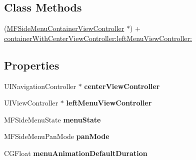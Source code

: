 \subsection*{Class Methods}
\begin{DoxyCompactItemize}
\item 
(\hyperlink{interface_m_f_side_menu_container_view_controller}{M\-F\-Side\-Menu\-Container\-View\-Controller} $\ast$) + \hyperlink{interface_m_f_side_menu_container_view_controller_a8dd4ba3c4452eb18fe9bfe73aebd978a}{container\-With\-Center\-View\-Controller\-:left\-Menu\-View\-Controller\-:}
\end{DoxyCompactItemize}
\subsection*{Properties}
\begin{DoxyCompactItemize}
\item 
\hypertarget{interface_m_f_side_menu_container_view_controller_a49e8e7e16a8d53b0e0c4378994c3abe5}{U\-I\-Navigation\-Controller $\ast$ {\bfseries center\-View\-Controller}}\label{interface_m_f_side_menu_container_view_controller_a49e8e7e16a8d53b0e0c4378994c3abe5}

\item 
\hypertarget{interface_m_f_side_menu_container_view_controller_a048098d93fef8397e4419e77d697b521}{U\-I\-View\-Controller $\ast$ {\bfseries left\-Menu\-View\-Controller}}\label{interface_m_f_side_menu_container_view_controller_a048098d93fef8397e4419e77d697b521}

\item 
\hypertarget{interface_m_f_side_menu_container_view_controller_a4ee6f366285ae4e3b63af91d8aeed278}{M\-F\-Side\-Menu\-State {\bfseries menu\-State}}\label{interface_m_f_side_menu_container_view_controller_a4ee6f366285ae4e3b63af91d8aeed278}

\item 
\hypertarget{interface_m_f_side_menu_container_view_controller_aee44d69de8e8ce0550b7302d69c5558a}{M\-F\-Side\-Menu\-Pan\-Mode {\bfseries pan\-Mode}}\label{interface_m_f_side_menu_container_view_controller_aee44d69de8e8ce0550b7302d69c5558a}

\item 
\hypertarget{interface_m_f_side_menu_container_view_controller_a342f7eaf6e1081866b0020cc21004798}{C\-G\-Float {\bfseries menu\-Animation\-Default\-Duration}}\label{interface_m_f_side_menu_container_view_controller_a342f7eaf6e1081866b0020cc21004798}


\end{DoxyCompactItemize}
